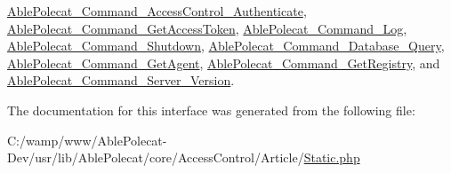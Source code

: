 \hyperlink{class_able_polecat___command___access_control___authenticate_a4ef9bd37ba3ce8a13c1e8bcf4f72a630}{Able\+Polecat\+\_\+\+Command\+\_\+\+Access\+Control\+\_\+\+Authenticate}, \hyperlink{class_able_polecat___command___get_access_token_a4ef9bd37ba3ce8a13c1e8bcf4f72a630}{Able\+Polecat\+\_\+\+Command\+\_\+\+Get\+Access\+Token}, \hyperlink{class_able_polecat___command___log_a4ef9bd37ba3ce8a13c1e8bcf4f72a630}{Able\+Polecat\+\_\+\+Command\+\_\+\+Log}, \hyperlink{class_able_polecat___command___shutdown_a4ef9bd37ba3ce8a13c1e8bcf4f72a630}{Able\+Polecat\+\_\+\+Command\+\_\+\+Shutdown}, \hyperlink{class_able_polecat___command___database___query_a4ef9bd37ba3ce8a13c1e8bcf4f72a630}{Able\+Polecat\+\_\+\+Command\+\_\+\+Database\+\_\+\+Query}, \hyperlink{class_able_polecat___command___get_agent_a4ef9bd37ba3ce8a13c1e8bcf4f72a630}{Able\+Polecat\+\_\+\+Command\+\_\+\+Get\+Agent}, \hyperlink{class_able_polecat___command___get_registry_a4ef9bd37ba3ce8a13c1e8bcf4f72a630}{Able\+Polecat\+\_\+\+Command\+\_\+\+Get\+Registry}, and \hyperlink{class_able_polecat___command___server___version_a4ef9bd37ba3ce8a13c1e8bcf4f72a630}{Able\+Polecat\+\_\+\+Command\+\_\+\+Server\+\_\+\+Version}.



The documentation for this interface was generated from the following file\+:\begin{DoxyCompactItemize}
\item 
C\+:/wamp/www/\+Able\+Polecat-\/\+Dev/usr/lib/\+Able\+Polecat/core/\+Access\+Control/\+Article/\hyperlink{_static_8php}{Static.\+php}\end{DoxyCompactItemize}
